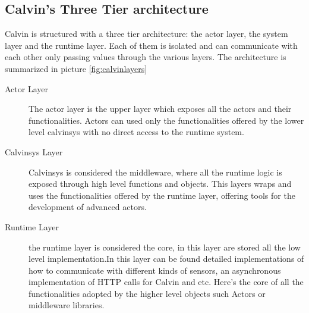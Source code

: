 \subsection{Calvin's Three Tier architecture}

Calvin is structured with a three tier architecture: the actor layer, the system layer and the runtime layer.
Each of them is isolated and can communicate with each other only passing values through the various
layers. The architecture is summarized in picture \ref{fig:calvinlayers}

\begin{description}
    \item[Actor Layer] The actor layer is the upper layer which exposes all the actors and their functionalities.
    Actors can used only the functionalities offered by the lower level calvinsys with no direct access to the runtime
    system.
    \item[Calvinsys Layer] Calvinsys is considered the middleware, where all the runtime logic is exposed through
    high level functions and objects. This layers wraps and uses the functionalities offered by the runtime layer,
    offering tools for the development of advanced actors.
    \item[Runtime Layer] the runtime layer is considered the core, in this layer are stored all the low level
    implementation.In this layer can be found detailed implementations of how to communicate with different kinds
    of sensors, an asynchronous implementation of HTTP calls for Calvin and etc. Here's the core of all
    the functionalities adopted by the higher level objects such Actors or middleware libraries.
\end{description}

